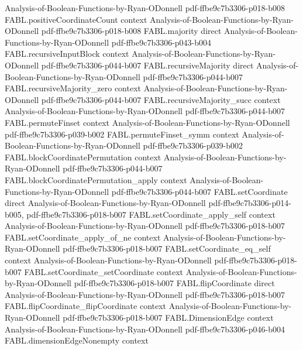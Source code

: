 \begin{theorem}
  {Analysis-of-Boolean-Functions-by-Ryan-ODonnell}
  {pdf-ffbe9c7b3306-p018-b008}
\proofstep
  {FABL.positiveCoordinateCount}
  {context}
  {Analysis-of-Boolean-Functions-by-Ryan-ODonnell}
  {pdf-ffbe9c7b3306-p018-b008}
\proofstep
  {FABL.majority}
  {direct}
  {Analysis-of-Boolean-Functions-by-Ryan-ODonnell}
  {pdf-ffbe9c7b3306-p043-b004}
\proofstep
  {FABL.recursiveInputBlock}
  {context}
  {Analysis-of-Boolean-Functions-by-Ryan-ODonnell}
  {pdf-ffbe9c7b3306-p044-b007}
\proofstep
  {FABL.recursiveMajority}
  {direct}
  {Analysis-of-Boolean-Functions-by-Ryan-ODonnell}
  {pdf-ffbe9c7b3306-p044-b007}
\proofstep
  {FABL.recursiveMajority_zero}
  {context}
  {Analysis-of-Boolean-Functions-by-Ryan-ODonnell}
  {pdf-ffbe9c7b3306-p044-b007}
\proofstep
  {FABL.recursiveMajority_succ}
  {context}
  {Analysis-of-Boolean-Functions-by-Ryan-ODonnell}
  {pdf-ffbe9c7b3306-p044-b007}
\proofstep
  {FABL.permuteFinset}
  {context}
  {Analysis-of-Boolean-Functions-by-Ryan-ODonnell}
  {pdf-ffbe9c7b3306-p039-b002}
\proofstep
  {FABL.permuteFinset_symm}
  {context}
  {Analysis-of-Boolean-Functions-by-Ryan-ODonnell}
  {pdf-ffbe9c7b3306-p039-b002}
\proofstep
  {FABL.blockCoordinatePermutation}
  {context}
  {Analysis-of-Boolean-Functions-by-Ryan-ODonnell}
  {pdf-ffbe9c7b3306-p044-b007}
\proofstep
  {FABL.blockCoordinatePermutation_apply}
  {context}
  {Analysis-of-Boolean-Functions-by-Ryan-ODonnell}
  {pdf-ffbe9c7b3306-p044-b007}
\proofstep
  {FABL.setCoordinate}
  {direct}
  {Analysis-of-Boolean-Functions-by-Ryan-ODonnell}
  {pdf-ffbe9c7b3306-p014-b005,
    pdf-ffbe9c7b3306-p018-b007}
\proofstep
  {FABL.setCoordinate_apply_self}
  {context}
  {Analysis-of-Boolean-Functions-by-Ryan-ODonnell}
  {pdf-ffbe9c7b3306-p018-b007}
\proofstep
  {FABL.setCoordinate_apply_of_ne}
  {context}
  {Analysis-of-Boolean-Functions-by-Ryan-ODonnell}
  {pdf-ffbe9c7b3306-p018-b007}
\proofstep
  {FABL.setCoordinate_eq_self}
  {context}
  {Analysis-of-Boolean-Functions-by-Ryan-ODonnell}
  {pdf-ffbe9c7b3306-p018-b007}
\proofstep
  {FABL.setCoordinate_setCoordinate}
  {context}
  {Analysis-of-Boolean-Functions-by-Ryan-ODonnell}
  {pdf-ffbe9c7b3306-p018-b007}
\proofstep
  {FABL.flipCoordinate}
  {direct}
  {Analysis-of-Boolean-Functions-by-Ryan-ODonnell}
  {pdf-ffbe9c7b3306-p018-b007}
\proofstep
  {FABL.flipCoordinate_flipCoordinate}
  {context}
  {Analysis-of-Boolean-Functions-by-Ryan-ODonnell}
  {pdf-ffbe9c7b3306-p018-b007}
\proofstep
  {FABL.DimensionEdge}
  {context}
  {Analysis-of-Boolean-Functions-by-Ryan-ODonnell}
  {pdf-ffbe9c7b3306-p046-b004}
\proofstep
  {FABL.dimensionEdgeNonempty}
  {context}

\end{theorem}
